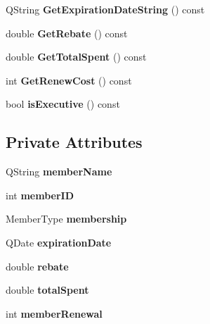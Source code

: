 \begin{DoxyCompactItemize}
Q\+String {\bfseries Get\+Expiration\+Date\+String} () const
\item 
\mbox{\label{class_member_adf6de50fe7517be7cd2a009bffc615b5}} 
double {\bfseries Get\+Rebate} () const
\item 
\mbox{\label{class_member_a19cb2fa14badadbd3eb5eea4f94179d4}} 
double {\bfseries Get\+Total\+Spent} () const
\item 
\mbox{\label{class_member_ab7f45754db08f7b1f586e2a43b4dfffe}} 
int {\bfseries Get\+Renew\+Cost} () const
\item 
\mbox{\label{class_member_a7cb29a17a2bed42772a22af7cdf4aec4}} 
bool {\bfseries is\+Executive} () const
\end{DoxyCompactItemize}
\subsection*{Private Attributes}
\begin{DoxyCompactItemize}
\item 
\mbox{\label{class_member_af0efc05d5ee8d89cc6b3bd588bcb9139}} 
Q\+String {\bfseries member\+Name}
\item 
\mbox{\label{class_member_a8a938869fd648e0625eefa6bd38b2c06}} 
int {\bfseries member\+ID}
\item 
\mbox{\label{class_member_ab283f12cb682b78f0524850f53f9d36b}} 
Member\+Type {\bfseries membership}
\item 
\mbox{\label{class_member_a697e8d1fc0417da55627350df5e02b47}} 
Q\+Date {\bfseries expiration\+Date}
\item 
\mbox{\label{class_member_a351d6d0f9eafd12525300d937bb4438b}} 
double {\bfseries rebate}
\item 
\mbox{\label{class_member_ab2ca88932004e0c2005bbf837a5d6d58}} 
double {\bfseries total\+Spent}
\item 
\mbox{\label{class_member_a3612665d378d6ccaaaaad560d6ba70db}} 
int {\bfseries member\+Renewal}
\end{DoxyCompactItemize}


